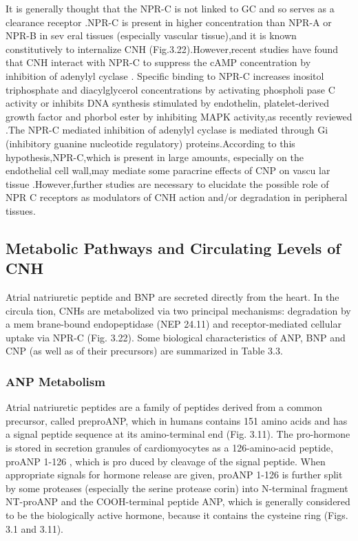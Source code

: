 \documentclass[14pt,a4paper,onecolumn]{extarticle}
\begin{document}
It is generally thought that the NPR-C is not linked to GC and so serves as a clearance receptor \citep{28} \citep{77} \citep{78}.NPR-C is present in higher concentration than NPR-A or NPR-B in sev eral tissues (especially vascular tissue),and it is known constitutively to internalize CNH \citep{172} (Fig.3.22).However,recent studies have found that CNH interact with NPR-C to suppress the cAMP concentration by inhibition of adenylyl cyclase \citep{190} \citep{191}. Specific binding to NPR-C increases inositol triphosphate and diacylglycerol concentrations by activating phospholi pase C activity or inhibits DNA synthesis stimulated by endothelin, platelet-derived growth factor and phorbol ester by inhibiting MAPK activity,as recently reviewed \citep{190}.The NPR-C mediated inhibition of adenylyl cyclase is mediated through Gi (inhibitory guanine nucleotide regulatory) proteins.According to this hypothesis,NPR-C,which is present in large amounts, especially on the endothelial cell wall,may mediate some paracrine effects of CNP on vascu lar tissue \citep{168} \citep{190}.However,further studies are necessary to elucidate the possible role of NPR C receptors as modulators of CNH action and/or degradation in peripheral tissues.

\subsection{Metabolic Pathways and Circulating Levels of CNH
}
Atrial natriuretic peptide and BNP are secreted directly from the heart. In the circula tion, CNHs are metabolized via two principal mechanisms: degradation by a mem brane-bound endopeptidase (NEP 24.11) and receptor-mediated cellular uptake via NPR-C \citep{14} (Fig. 3.22). Some biological characteristics of ANP, BNP and CNP (as well as of their precursors) are summarized in Table 3.3.

\subsubsection{ANP Metabolism
}
Atrial natriuretic peptides are a family of peptides derived from a common precursor, called preproANP, which in humans contains 151 amino acids and has a signal peptide sequence at its amino-terminal end (Fig. 3.11). The pro-hormone is stored in secretion granules of cardiomyocytes as a 126-amino-acid peptide, proANP 1-126 , which is pro duced by cleavage of the signal peptide. When appropriate signals for hormone release are given, proANP 1-126 is further split by some proteases (especially the serine protease corin) \citep{192} into N-terminal fragment NT-proANP and the COOH-terminal peptide ANP, which is generally considered to be the biologically active hormone, because it contains the cysteine ring (Figs. 3.1 and 3.11).
\end{document}
